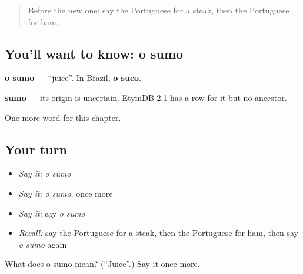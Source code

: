 \begin{quote}
Before the new one: say the Portuguese for a steak, then the Portuguese for ham.
\end{quote}

\subsection*{You'll want to know: o sumo}
\textbf{o sumo} — \textquotedblleft{}juice\textquotedblright{}. In Brazil, \textbf{o suco}.

\begin{cousinweb}
\textbf{sumo} — its origin is uncertain. EtymDB 2.1 has a row for it but no ancestor.
\end{cousinweb}

\begin{grammarlens}[title={What you've built}]
One more word for this chapter.
\end{grammarlens}

\subsection*{Your turn}
\begin{itemize}
\raggedright
  \item \emph{Say it:} \emph{o sumo}
  \item \emph{Say it:} \emph{o sumo}, once more
  \item \emph{Say it:} say \emph{o sumo}
  \item \emph{Recall:} say the Portuguese for a steak, then the Portuguese for ham, then say \emph{o sumo} again
\end{itemize}

\begin{tcolorbox}[breakable,colback=teal!4,colframe=teal!35!black,title={Before you move on}]
What does o sumo mean? (\textquotedblleft{}Juice\textquotedblright{}.) Say it once more.
\end{tcolorbox}
